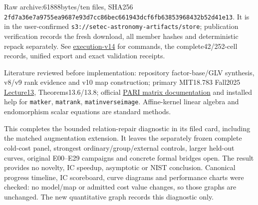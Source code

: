 \documentclass[
  10pt,
]{article}
\begin{document}
Raw archive:61888bytes/ten files, SHA256
\texttt{2fd7a36e\allowbreak{}7a9755ea\allowbreak{}9687e93d\allowbreak{}7cc86bec\allowbreak{}661943dc\allowbreak{}f6fb6385\allowbreak{}3968432b\allowbreak{}52d41e13}.
It is in the user-confirmed
\texttt{s3://setec-astronomy-artifacts/store}; publication verification
records the fresh download, all member hashes and deterministic repack
separately. See \href{../../execution-v14/README.md}{execution-v14} for
commands, the complete42/252-cell records, unified export and exact
validation receipts.

Literature reviewed before implementation: repository factor-base/GLV
synthesis, v8/v9 rank evidence and v10 map construction; primary
MIT18.783 Fall2025
\href{https://math.mit.edu/classes/18.783/2025/LectureNotes13.pdf}{Lecture13},
Theorems13.6/13.8; official
\href{https://pari.math.u-bordeaux.fr/dochtml/html-stable/Vectors__matrices__linear_algebra_and_sets.html}{PARI
matrix documentation} and installed help for \texttt{matker},
\texttt{matrank}, \texttt{matinverseimage}. Affine-kernel linear algebra
and endomorphism scalar equations are standard methods.

This completes the bounded relation-repair diagnostic in its filed card,
including the matched augmentation extension. It leaves the separately
frozen complete cold-cost panel, strongest ordinary/group/external
controls, larger held-out curves, original E00--E29 campaigns and
concrete formal bridges open. The result provides no novelty, IC
speedup, asymptotic or NIST conclusion. Canonical progress timeline, IC
scoreboard, curve diagrams and performance charts were checked: no
model/map or admitted cost value changes, so those graphs are unchanged.
The new quantitative graph records this diagnostic only.
\end{document}

